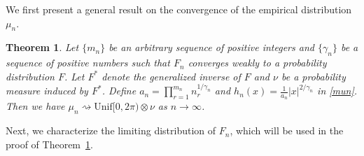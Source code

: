 \documentclass[11pt]{article}
\newtheorem{thm}{\textbf{Theorem}}[section]
\numberwithin{equation}{section}
\begin{document}
We first present a general result on the convergence of the
empirical distribution $\mu_n$.

\begin{thm}\label{general}
    Let $\{m_n\}$ be an arbitrary sequence of positive
    integers and $\{\gamma_n\}$ be a sequence of positive numbers
    such that $F_n$ converges weakly to a probability distribution
    $F$.  Let $F^*$ denote the generalized inverse of $F$ and $\nu$
    be  a probability measure induced by $F^*$. Define $a_n=\prod_{r=1}^{m_n}n_r^{1/\gamma_{n}}$ and $h_n(x)=\frac{1}{a_n}|x|^{2/\gamma_{n}}$
    in \eqref{mun}.  Then we have $\mu_n \rightsquigarrow
\mathrm{Unif}[0,2 \pi)\otimes \nu$ as $n\to
    \infty$.
\end{thm}



Next,  we characterize the limiting distribution of $F_n$, which
will be used in the proof of Theorem~\ref{general}.
\end{document}
